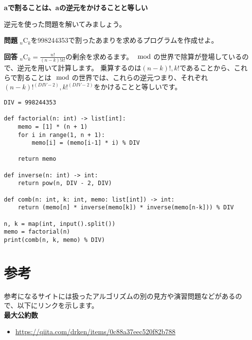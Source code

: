 \documentclass{jlreq}
\begin{document}
  \vspace{0.5cm}

  \begin{center}
    \textbf{aで割ることは、aの逆元をかけることと等しい}
  \end{center}

  逆元を使った問題を解いてみましょう。

  \begin{tcolorbox}[enhanced,
    colback=white!85!gray,
    drop fuzzy shadow,
    boxrule=0.3mm,
    arc=0mm,
    left=0pt,
    top=0pt,
    sharp corners,
    width=\textwidth,
    ]
    \textbf{問題}
    ${}_n \mathrm{C}_k$を998244353で割ったあまりを求めるプログラムを作成せよ。
  \tcblower

  \begin{tcolorbox}[
    coltext=white!10!blue,
    colback=white!90!purple!90!blue,
    drop fuzzy shadow,
    boxrule=0mm,
    arc=0mm,
    width=1.3cm,
    left=0pt,
    right=0pt,
    top=0pt,
    bottom=0pt,
    halign=flush left,
  ]
  \end{tcolorbox}
  \tcblower
  \textbf{回答} 
  ${}_n \mathrm{C}_k = \frac{n!}{(n - k)! k!}$の剰余を求めるます。$\mod$の世界で除算が登場しているので、逆元を用いて計算します。
  乗算するのは$(n - k)!, k!$であることから、これらで割ることは$\mod$の世界では、これらの逆元つまり、それぞれ$(n - k)!^{(DIV-2)}, k!^{(DIV-2)}$をかけることと等しいです。
  \begin{lstlisting}[caption=${}_n \mathrm{C}_k$を求める, label=combination]
DIV = 998244353

def factorial(n: int) -> list[int]:
    memo = [1] * (n + 1)
    for i in range(1, n + 1):
        memo[i] = (memo[i-1] * i) % DIV
    
    return memo

def inverse(n: int) -> int:
    return pow(n, DIV - 2, DIV)

def comb(n: int, k: int, memo: list[int]) -> int:
    return (memo[n] * inverse(memo[k]) * inverse(memo[n-k])) % DIV
 
n, k = map(int, input().split())
memo = factorial(n)
print(comb(n, k, memo) % DIV)
  \end{lstlisting}
  \end{tcolorbox}%

\section{参考}
参考になるサイトには扱ったアルゴリズムの別の見方や演習問題などがあるので、以下にリンクを示します。\\
\textbf{最大公約数}
\begin{itemize}
    \item \url{https://qiita.com/drken/items/0c88a37eec520f82b788}
\end{itemize}
\end{document}
